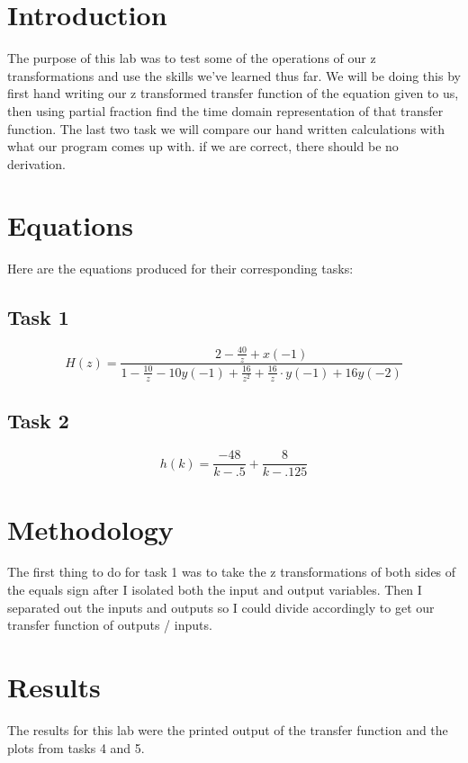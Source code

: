 \documentclass[12pt]{report}
\begin{document}
\section{Introduction}
 
The purpose of this lab was to test some of the operations of our z transformations and use the skills we've learned thus far. We will be doing this by first hand writing our z transformed transfer function of the equation given to us, then using partial fraction find the time domain representation of that transfer function. The last two task we will compare our hand written calculations with what our program comes up with. if we are correct, there should be no derivation. 

\section{Equations}

Here are the equations produced for their corresponding tasks:

\subsection{Task 1}
\begin{equation*}
H(z) = \frac{2 - \frac{40}{z} + x(-1)}{1 - \frac{10}{z} - 10y(-1) + \frac{16}{z^2} + \frac{16}{z}\cdot y(-1) + 16y(-2)}
\end{equation*}

\subsection{Task 2}
\begin{equation*}
h(k) = \frac{-48}{k-.5} + \frac{8}{k-.125}
\end{equation*}

\section{Methodology}
The first thing to do for task 1 was to take the z transformations of both sides of the equals sign after I isolated both the input and output variables. Then I separated out the inputs and outputs so I could divide accordingly to get our transfer function of outputs / inputs. 

\section{Results}
The results for this lab were the printed output of the transfer function and the plots from tasks 4 and 5. 
\end{document}
